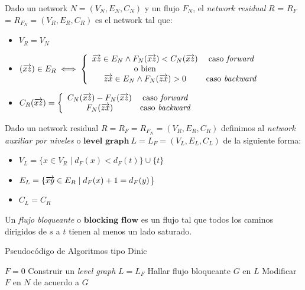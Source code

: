 \begin{definition}
Dado un network $N = (V_N, E_N, C_N)$ y un flujo $F_N$, el \emph{network residual} $R$ = $R_F$ = $R_{F_N} = (V_R, E_R, C_R)$ es el network tal que:
\begin{itemize}
    \item $V_R = V_N$
    \item $(\overrightarrow{xz}) \in E_R \iff 
    \left\{ 
    \begin{array}{cc}
    \overrightarrow{xz} \in E_N \wedge F_N(\overrightarrow{xz}) < C_N(\overrightarrow{xz})     & \text{caso \textit{forward}} \\
    \text{o bien}  & \\
    \overrightarrow{zx} \in E_N \wedge F_N(\overrightarrow{zx}) > 0 & \text{caso \textit{backward}}
    \end{array}
    \right.$
    \item $C_R(\overrightarrow{xz}) = \left\{
    \begin{array}{cc}
        C_N(\overrightarrow{xz}) -
        F_N(\overrightarrow{xz})   & \text{caso \textit{forward}}\\
        F_N(\overrightarrow{zx})   & \text{caso \textit{backward}}
    \end{array}
    \right.
    $
\end{itemize}
\end{definition}

\begin{definition}
Dado un network residual $R = R_F = R_{F_N} = (V_R, E_R, C_R)$ definimos al \emph{network auxiliar por niveles} o $\boldsymbol{level}$  $\boldsymbol{graph}\ L = L_F = (V_L, E_L, C_L)$ de la siguiente forma:
\begin{itemize}
    \item $V_L = \{ x\in V_R \mid d_F(x) < d_F(t)\} \cup \{t\}$
    \item $E_L = \{\overrightarrow{xy} \in E_R \mid d_F(x) + 1 = d_F(y)$\}
    \item $C_L = C_R$
\end{itemize}

\end{definition}

\begin{definition}
Un \emph{flujo bloqueante} o $\boldsymbol{blocking}$  $\boldsymbol{flow}$ es un flujo tal que todos los caminos dirigidos de $s$ a $t$ tienen al menos un lado saturado.
\end{definition}

\begin{algorithm}
\caption{Pseudocódigo de Algoritmos tipo Dinic}
\begin{algorithmic}
\State $F = 0$
    \State Construir un \textit{level graph} $L = L_F$
    \State Hallar flujo bloqueante $G$ en $L$
    \State Modificar $F$ en $N$ de acuerdo a $G$
\EndWhile

\end{algorithmic}
\end{algorithm}

